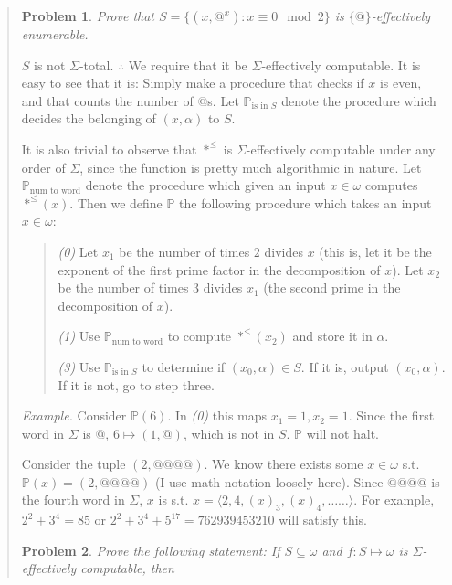 \documentclass[a4paper, 12pt]{article}
\newtheorem{problem}{Problem}
\newtheorem{problem}{Problem}
\begin{document}
\small
\begin{quote}

\begin{problem}
    Prove that $S = \{(x, @^x) : x \equiv 0 \mod 2\}$ is $\{@\}$-effectively
    enumerable.
\end{problem}

$S$ is not $\Sigma$-total. $\therefore $ We require that it be
$\Sigma$-effectively computable. It is easy to see that
it is: Simply make a procedure that checks if $x$ is even, and that counts the
number of $@$s. Let $\mathbb{P}_\text{is in $S$}$ denote the procedure which decides the belonging of
$(x, \alpha)$ to $S$. 

It is also trivial to observe that $*^{\leq}$ is $\Sigma$-effectively
computable under any order of $\Sigma$, since the function is pretty much
algorithmic in nature. Let $\mathbb{P}_{\text{num to word}}$ denote the
procedure which given an input $x \in  \omega$ computes $*^{\leq}(x)$. Then we
define $\mathbb{P}$ the following procedure which takes an input $x \in
\omega$:

\footnotesize 
\begin{quote}
    \textit{(0)} Let $x_1$ be the number of times $2$ divides $x$ (this is, let
    it be the exponent of the first prime factor in the decomposition of $x$).
    Let $x_2$ be the number of times $3$ divides $x_1$ (the second prime in the
    decomposition of $x$).

    \textit{(1)} Use $\mathbb{P}_{\text{num to word}}$ to compute $*^{\leq}(x_2)$
    and store it in $\alpha$. 

    \textit{(3)} Use $\mathbb{P}_{\text{is in $S$}}$ to determine if $(x_0,
    \alpha) \in  S$. If it is, output $(x_0, \alpha)$. If it is not, go to step
    three.
\end{quote}
\small

\textit{Example.} Consider $\mathbb{P}(6)$. In \textit{(0)} this maps $x_1 = 1,
x_2 = 1$. Since the first word in $\Sigma$ is $@$, $6 \mapsto (1, @)$, which is
not in $S$. $\mathbb{P}$ will not halt.

Consider the tuple $(2, @@@@)$. We know there exists some $x \in \omega$ s.t.
$\mathbb{P}(x) = (2, @@@@)$ (I use math notation loosely here). Since $@@@@$ is
the fourth word in $\Sigma$, $x$ is s.t.
 $x = \langle 2, 4, (x)_3, (x)_4, \ldots \ldots\rangle $. For example, $2^2 + 3^4 =
85$ or $2^2 + 3^4 + 5^{17} = 762939453210$ will satisfy this.


\begin{problem}
    Prove the following statement: If $S \subseteq \omega$ and $f : S \mapsto
    \omega$ is $\Sigma$-effectively computable, then 
    

\end{problem}
\end{quote}
\end{document}
